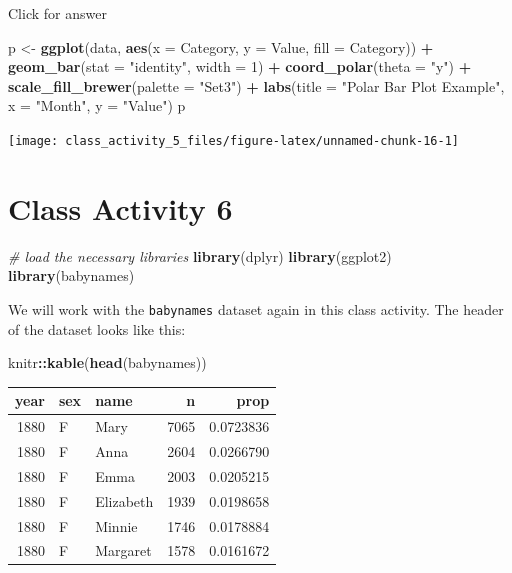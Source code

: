 \documentclass[
]{book}
\newenvironment{Shaded}{\begin{snugshade}}{\end{snugshade}}
\newcommand{\AttributeTok}[1]{\textcolor[rgb]{0.13,0.29,0.53}{#1}}
\newcommand{\CommentTok}[1]{\textcolor[rgb]{0.56,0.35,0.01}{\textit{#1}}}
\newcommand{\DecValTok}[1]{\textcolor[rgb]{0.00,0.00,0.81}{#1}}
\newcommand{\FunctionTok}[1]{\textcolor[rgb]{0.13,0.29,0.53}{\textbf{#1}}}
\newcommand{\NormalTok}[1]{#1}
\newcommand{\OtherTok}[1]{\textcolor[rgb]{0.56,0.35,0.01}{#1}}
\newcommand{\SpecialCharTok}[1]{\textcolor[rgb]{0.81,0.36,0.00}{\textbf{#1}}}
\newcommand{\StringTok}[1]{\textcolor[rgb]{0.31,0.60,0.02}{#1}}
\begin{document}
Click for answer

\begin{Shaded}
\begin{Highlighting}[]
\NormalTok{p }\OtherTok{\textless{}{-}} \FunctionTok{ggplot}\NormalTok{(data, }\FunctionTok{aes}\NormalTok{(}\AttributeTok{x =}\NormalTok{ Category, }\AttributeTok{y =}\NormalTok{ Value, }\AttributeTok{fill =}\NormalTok{ Category)) }\SpecialCharTok{+}
  \FunctionTok{geom\_bar}\NormalTok{(}\AttributeTok{stat =} \StringTok{"identity"}\NormalTok{, }\AttributeTok{width =} \DecValTok{1}\NormalTok{) }\SpecialCharTok{+}
  \FunctionTok{coord\_polar}\NormalTok{(}\AttributeTok{theta =} \StringTok{"y"}\NormalTok{) }\SpecialCharTok{+}
  \FunctionTok{scale\_fill\_brewer}\NormalTok{(}\AttributeTok{palette =} \StringTok{"Set3"}\NormalTok{) }\SpecialCharTok{+}
  \FunctionTok{labs}\NormalTok{(}\AttributeTok{title =} \StringTok{"Polar Bar Plot Example"}\NormalTok{, }\AttributeTok{x =} \StringTok{"Month"}\NormalTok{, }\AttributeTok{y =} \StringTok{"Value"}\NormalTok{)}
\NormalTok{p}
\end{Highlighting}
\end{Shaded}

\texttt{[image: class\_activity\_5\_files/figure-latex/unnamed-chunk-16-1]}

\hypertarget{class-activity-6}{%
\chapter{Class Activity 6}\label{class-activity-6}}

\begin{Shaded}
\begin{Highlighting}[]
\CommentTok{\# load the necessary libraries}
\FunctionTok{library}\NormalTok{(dplyr)}
\FunctionTok{library}\NormalTok{(ggplot2)}
\FunctionTok{library}\NormalTok{(babynames)}
\end{Highlighting}
\end{Shaded}

We will work with the \texttt{babynames} dataset again in this class activity. The header of the dataset looks like this:

\begin{Shaded}
\begin{Highlighting}[]
\NormalTok{knitr}\SpecialCharTok{::}\FunctionTok{kable}\NormalTok{(}\FunctionTok{head}\NormalTok{(babynames))}
\end{Highlighting}
\end{Shaded}

\begin{tabular}{r|l|l|r|r}
\hline
year & sex & name & n & prop\\
\hline
1880 & F & Mary & 7065 & 0.0723836\\
\hline
1880 & F & Anna & 2604 & 0.0266790\\
\hline
1880 & F & Emma & 2003 & 0.0205215\\
\hline
1880 & F & Elizabeth & 1939 & 0.0198658\\
\hline
1880 & F & Minnie & 1746 & 0.0178884\\
\hline
1880 & F & Margaret & 1578 & 0.0161672\\
\hline
\end{tabular}
\end{document}
